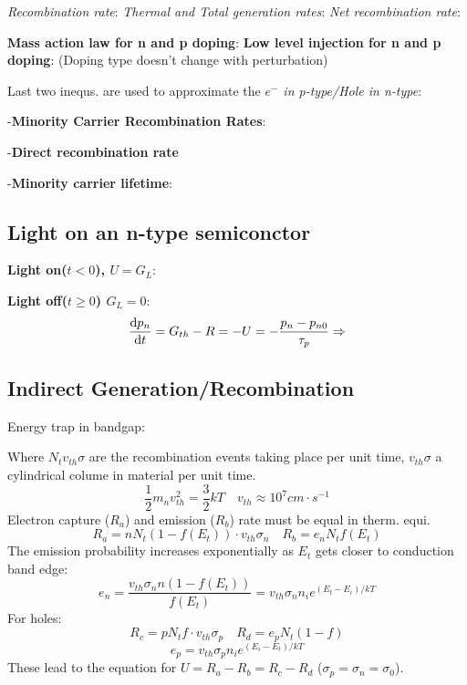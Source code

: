 \documentclass[a4paper, fontsize=8pt, landscape, DIV=1]{scrartcl}
\begin{document}
\begin{multicols*}{4}
\textit{Recombination rate}:
\textit{Thermal and Total generation rates}:
\textit{Net recombination rate}:

\textbf{Mass action law for n and p doping}:
\textbf{Low level injection for n and p doping}:
(Doping type doesn't change with perturbation)

Last two inequs. are used to approximate the \textit{$e^-$ in p-type/Hole in n-type}:

-\textbf{Minority Carrier Recombination Rates}:

-\textbf{Direct recombination rate}

-\textbf{Minority carrier lifetime}:

\subsection{Light on an n-type semiconctor}
\textbf{Light on($t<0$), $U = G_L$}:
      
\textbf{Light off($t\geq 0$) $G_L=0$}:
$$\frac{\mathrm{d}p_n}{\mathrm{d}t} = G_{th} - R = -U = -\frac{p_n-p_{n0}}{\tau_p}\Rightarrow$$

\subsection{Indirect Generation/Recombination}
Energy trap in bandgap:

Where $N_tv_{th}\sigma$ are the recombination events taking place per unit time, $v_{th}\sigma$ a cylindrical colume in material per unit time.
\[\frac{1}{2}m_nv_{th}^2=\frac{3}{2}kT \quad v_{th}\approx 10^7 cm\cdot s^{-1}\]
Electron capture ($R_a$) and emission ($R_b$) rate must be equal in therm. equi.
\[R_a = nN_t(1-f(E_t))\cdot v_{th}\sigma_n \quad R_b = e_nN_tf(E_t)\]
The emission probability increases exponentially as $E_t$ gets closer to conduction band edge:
\[e_n = \frac{v_{th}\sigma_nn(1-f(E_t))}{f(E_t)}=v_{th}\sigma_nn_ie^{(E_t-E_i)/kT}\]
For holes:
\[R_c = pN_tf\cdot v_{th}\sigma_p \quad R_d = e_pN_t(1-f)\]
\[e_p = v_{th}\sigma_p n_i e^{(E_i-E_t)/kT}\]
These lead to the equation for $U=R_a-R_b=R_c-R_d$ ($\sigma_p=\sigma_n=\sigma_0$).


\end{multicols*}
\end{document}
